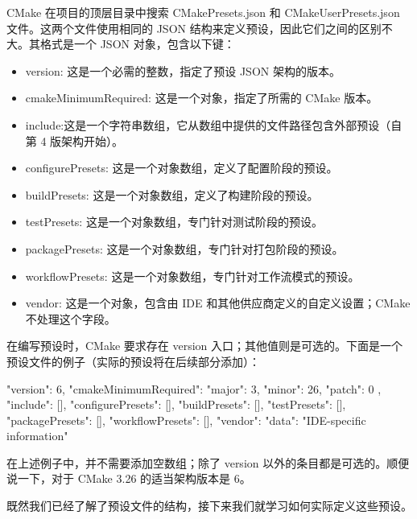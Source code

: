 CMake 在项目的顶层目录中搜索 CMakePresets.json 和 CMakeUserPresets.json 文件。这两个文件使用相同的 JSON 结构来定义预设，因此它们之间的区别不大。其格式是一个 JSON 对象，包含以下键：

\begin{itemize}
\item
version:  这是一个必需的整数，指定了预设 JSON 架构的版本。

\item
cmakeMinimumRequired: 这是一个对象，指定了所需的 CMake 版本。

\item
include:这是一个字符串数组，它从数组中提供的文件路径包含外部预设（自第 4 版架构开始）。

\item
configurePresets: 这是一个对象数组，定义了配置阶段的预设。

\item
buildPresets: 这是一个对象数组，定义了构建阶段的预设。

\item
testPresets: 这是一个对象数组，专门针对测试阶段的预设。

\item
packagePresets: 这是一个对象数组，专门针对打包阶段的预设。

\item
workflowPresets: 这是一个对象数组，专门针对工作流模式的预设。

\item
vendor: 这是一个对象，包含由 IDE 和其他供应商定义的自定义设置；CMake 不处理这个字段。
\end{itemize}

在编写预设时，CMake 要求存在 version 入口；其他值则是可选的。下面是一个预设文件的例子（实际的预设将在后续部分添加）：


\begin{json}
{
    "version": 6,
    "cmakeMinimumRequired": {
        "major": 3,
        "minor": 26,
        "patch": 0
    },
    "include": [],
    "configurePresets": [],
    "buildPresets": [],
    "testPresets": [],
    "packagePresets": [],
    "workflowPresets": [],
    "vendor": {
        "data": "IDE-specific information"
    }
}
\end{json}

在上述例子中，并不需要添加空数组；除了 version 以外的条目都是可选的。顺便说一下，对于 CMake 3.26 的适当架构版本是 6。

既然我们已经了解了预设文件的结构，接下来我们就学习如何实际定义这些预设。
